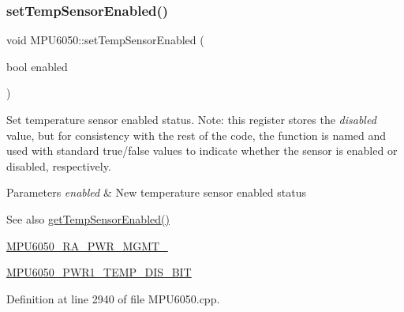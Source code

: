 \subsubsection{\texorpdfstring{setTempSensorEnabled()}{setTempSensorEnabled()}}
{\footnotesize\ttfamily void M\+P\+U6050\+::set\+Temp\+Sensor\+Enabled (\begin{DoxyParamCaption}\item[{bool}]{enabled }\end{DoxyParamCaption})}

Set temperature sensor enabled status. Note\+: this register stores the {\itshape disabled} value, but for consistency with the rest of the code, the function is named and used with standard true/false values to indicate whether the sensor is enabled or disabled, respectively.


\begin{DoxyParams}{Parameters}
{\em enabled} & New temperature sensor enabled status \\
\hline
\end{DoxyParams}
\begin{DoxySeeAlso}{See also}
\mbox{\hyperlink{classMPU6050_a31f588beab6760258212c65725eba336}{get\+Temp\+Sensor\+Enabled()}} 

\mbox{\hyperlink{MPU6050_8h_ac6c83146165a2307ac7155d4fa566df4}{M\+P\+U6050\+\_\+\+R\+A\+\_\+\+P\+W\+R\+\_\+\+M\+G\+M\+T\+\_}} 

\mbox{\hyperlink{MPU6050_8h_af87944da0c9b3b0a14ed2f0049fe0ec2}{M\+P\+U6050\+\_\+\+P\+W\+R1\+\_\+\+T\+E\+M\+P\+\_\+\+D\+I\+S\+\_\+\+B\+IT}} 
\end{DoxySeeAlso}


Definition at line 2940 of file M\+P\+U6050.\+cpp.


\begin{DoxyCode}{0}

\end{DoxyCode}
\mbox{\label{classMPU6050_a20dc4bdedbe1550580c28a6d090291be}} 
